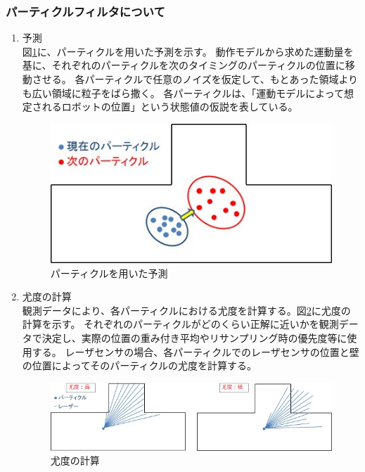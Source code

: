 \subsubsection{パーティクルフィルタについて}
  \begin{enumerate}
    \item 予測\\
    図\ref{auto:navstack:predict}に、パーティクルを用いた予測を示す。
    動作モデルから求めた運動量を基に、それぞれのパーティクルを次のタイミングのパーティクルの位置に移動させる。
    各パーティクルで任意のノイズを仮定して、もとあった領域よりも広い領域に粒子をばら撒く。
    各パーティクルは、「運動モデルによって想定されるロボットの位置」という状態値の仮説を表している。
    \begin{figure}[h]
      \begin{center}
        \includegraphics[width=.5\linewidth]{img/auto_14.jpg}
        \caption{パーティクルを用いた予測}
        \label{auto:navstack:predict}
      \end{center}
    \end{figure}
    \item 尤度の計算\\
    観測データにより、各パーティクルにおける尤度を計算する。図\ref{auto:navstack:yudo}に尤度の計算を示す。
    それぞれのパーティクルがどのくらい正解に近いかを観測データで決定し、実際の位置の重み付き平均やリサンプリング時の優先度等に使用する。
    レーザセンサの場合、各パーティクルでのレーザセンサの位置と壁の位置によってそのパーティクルの尤度を計算する。
    \begin{figure}[h]
      \begin{center}
        \includegraphics[width=\linewidth]{img/auto_15.jpg}
        \caption{尤度の計算}
        \label{auto:navstack:yudo}
      \end{center}
    \end{figure}

\end{enumerate}
